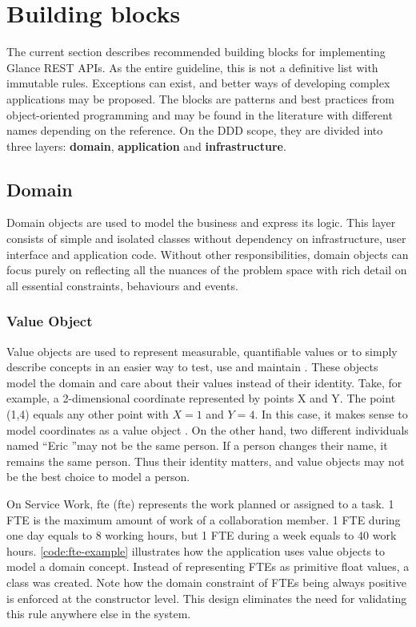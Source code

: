 \section{Building blocks}
\label{sec:building-blocks}

The current section describes recommended building blocks for implementing Glance REST APIs. As the entire guideline, this is not a definitive list with immutable rules. Exceptions can exist, and better ways of developing complex applications may be proposed. The blocks are patterns and best practices from object-oriented programming and may be found in the literature with different names depending on the reference. On the DDD scope, they are divided into three layers: \textbf{domain}, \textbf{application} and \textbf{infrastructure}.

\subsection{Domain}

Domain objects are used to model the business and express its logic. This layer consists of simple and isolated classes without dependency on infrastructure, user interface and application code. Without other responsibilities, domain objects can focus purely on reflecting all the nuances of the problem space with rich detail on all essential constraints, behaviours and events.

\subsubsection{Value Object}
\label{sec:value-object}

Value objects \cite{ddd-blue-book} \cite{ddd-reference} are used to represent measurable, quantifiable values or to simply describe concepts in an easier way to test, use and maintain \cite{ddd-red-book}. These objects model the domain and care about their values instead of their identity. Take, for example, a 2-dimensional coordinate represented by points X and Y. The point (1,4) equals any other point with $X = 1$ and $Y = 4$. In this case, it makes sense to model coordinates as a value object \cite{fowler-value-objects}. On the other hand, two different individuals named ``Eric ''may not be the same person. If a person changes their name, it remains the same person. Thus their identity matters, and value objects may not be the best choice to model a person.

On Service Work, \acrshort{fte} (\acrlong{fte}) represents the work planned or assigned to a task. 1 FTE is the maximum amount of work of a collaboration member. 1 FTE during one day equals to 8 working hours, but 1 FTE during a week equals to 40 work hours. \autoref{code:fte-example} illustrates how the application uses value objects to model a domain concept. Instead of representing FTEs as primitive float values, a class was created. Note how the domain constraint of FTEs being always positive is enforced at the constructor level. This design eliminates the need for validating this rule anywhere else in the system.

